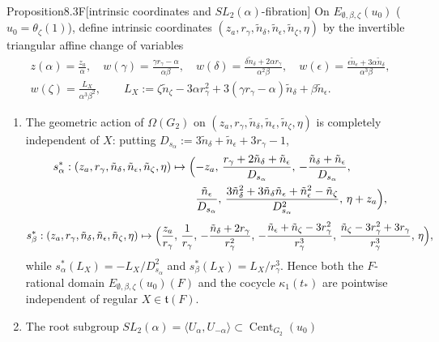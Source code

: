 \documentclass[12pt,letterpaper]{amsart}
\theoremstyle{plain}
\theoremstyle{definition}
\theoremstyle{remark}
\theoremstyle{definition}
\DeclareMathOperator{\Cent}{Cent}
\begin{document}
\begin{res}{Proposition}{8.3F}[intrinsic coordinates and $SL_2(\alpha)$-fibration]\label{res:8.3F}
On $E_{\emptyset,\beta,\zeta}(u_0)$ ($u_0=\theta_\zeta(1)$), define intrinsic
coordinates $(z_a,r_\gamma,\tilde n_\delta,\tilde n_\epsilon,\tilde n_\zeta,\eta)$
by the invertible triangular affine change of variables
\begin{equation}\tag{8.7d}\label{eq:8.7d}
\begin{gathered}
z(\alpha)=\frac{z_a}{\alpha},\quad
w(\gamma)=\frac{\gamma r_\gamma-\alpha}{\alpha\beta},\quad
w(\delta)=\frac{\delta\tilde n_\delta+2\alpha r_\gamma}{\alpha^2\beta},\quad
w(\epsilon)=\frac{\epsilon\tilde n_\epsilon+3\alpha\tilde n_\delta}{\alpha^3\beta},\\
w(\zeta)=\frac{L_X}{\alpha^3\beta^2},\qquad
L_X:=\zeta\tilde n_\zeta-3\alpha r_\gamma^2+3(\gamma r_\gamma-\alpha)\tilde n_\delta+\beta\tilde n_\epsilon.
\end{gathered}
\end{equation}
\begin{enumerate}[{\upshape(a)}]
\item The geometric action of $\Omega(G_2)$ on
$(z_a,r_\gamma,\tilde n_\delta,\tilde n_\epsilon,\tilde n_\zeta,\eta)$ is
completely independent of $X$: putting
$D_{s_\alpha}:=3\tilde n_\delta+\tilde n_\epsilon+3r_\gamma-1$,
\[
\begin{aligned}
s_\alpha^*:(z_a,r_\gamma,\tilde n_\delta,\tilde n_\epsilon,\tilde n_\zeta,\eta)\mapsto
\Bigl(&{-z_a},\,\frac{r_\gamma+2\tilde n_\delta+\tilde n_\epsilon}{D_{s_\alpha}},\,
-\frac{\tilde n_\delta+\tilde n_\epsilon}{D_{s_\alpha}},\\
&\frac{\tilde n_\epsilon}{D_{s_\alpha}},\,
\frac{3\tilde n_\delta^2+3\tilde n_\delta\tilde n_\epsilon+\tilde n_\epsilon^2-\tilde n_\zeta}{D_{s_\alpha}^2},\,
\eta+z_a\Bigr),
\end{aligned}
\]
\[
s_\beta^*:(z_a,r_\gamma,\tilde n_\delta,\tilde n_\epsilon,\tilde n_\zeta,\eta)\mapsto
\Bigl(\frac{z_a}{r_\gamma},\,\frac{1}{r_\gamma},\,-\frac{\tilde n_\delta+2r_\gamma}{r_\gamma^2},\,
-\frac{\tilde n_\epsilon+\tilde n_\zeta-3r_\gamma^2}{r_\gamma^3},\,
\frac{\tilde n_\zeta-3r_\gamma^2+3r_\gamma}{r_\gamma^3},\,\eta\Bigr),
\]
while $s_\alpha^*(L_X)=-L_X/D_{s_\alpha}^2$ and $s_\beta^*(L_X)=L_X/r_\gamma^3$.
Hence both the $F$-rational domain $E_{\emptyset,\beta,\zeta}(u_0)(F)$ and the
cocycle $\kappa_1(t_*)$ are pointwise independent of regular $X\in\mathfrak t(F)$.
\item The root subgroup $SL_2(\alpha)=\langle U_\alpha,U_{-\alpha}\rangle\subset\Cent_{G_2}(u_0)$

\end{enumerate}
\end{res}
\end{document}
